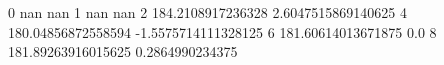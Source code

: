0 nan nan
1 nan nan
2 184.2108917236328 2.6047515869140625
4 180.04856872558594 -1.5575714111328125
6 181.60614013671875 0.0
8 181.89263916015625 0.2864990234375
